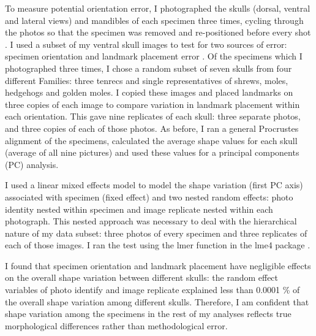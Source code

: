	To measure potential orientation error, I photographed the skulls (dorsal, ventral and lateral views) and mandibles of each specimen three times, cycling through the photos so that the specimen was removed and re-positioned before every shot \citep{Viscosi2011}.
	I used a subset of my ventral skull images to test for two sources of error: specimen orientation and landmark placement error \citep{Arnqvist1998, Barrow2008}. Of the specimens which I photographed three times,  I chose a random subset of seven skulls from four different Families: three tenrecs and single representatives of shrews, moles, hedgehogs and golden moles. I copied these images and placed landmarks on three copies of each image to compare variation in landmark placement within each orientation. This gave nine replicates of each skull: three separate photos, and three copies of each of those photos. As before, I ran a general Procrustes alignment \citep{Rohlf1993} of the specimens, calculated the average shape values for each skull (average of all nine pictures) and used these values for a principal components (PC) analysis. 
		
	I used a linear mixed effects model to model the shape variation (first PC axis) associated with specimen (fixed effect) and two nested random effects: photo identity nested within specimen and image replicate nested within each photograph. This nested approach was necessary to deal with the hierarchical nature of my data subset: three photos of every specimen and three replicates of each of those images. I ran the test using the lmer function in the lme4 package \citep{Bates2014}.  

	I found that specimen orientation and landmark placement have negligible effects on the overall shape variation between different skulls: the random effect variables of photo identify and image replicate explained less than 0.0001 \% of the overall shape variation among different skulls. Therefore, I am confident that shape variation among the specimens in the rest of my analyses reflects true morphological differences rather than methodological error.







